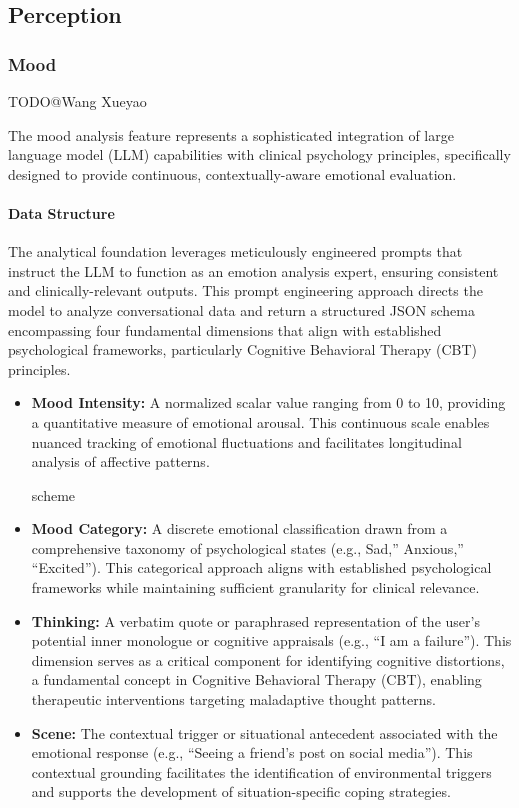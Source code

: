 \subsection{Perception}

\subsubsection{Mood}

TODO@Wang Xueyao  

The mood analysis feature represents a sophisticated integration of large language model (LLM) capabilities with clinical psychology principles, specifically designed to provide continuous, contextually-aware emotional evaluation.

\paragraph{Data Structure}

The analytical foundation leverages meticulously engineered prompts that instruct the LLM to function as an emotion analysis expert, ensuring consistent and clinically-relevant outputs. This prompt engineering approach directs the model to analyze conversational data and return a structured JSON schema encompassing four fundamental dimensions that align with established psychological frameworks, particularly Cognitive Behavioral Therapy (CBT) principles.

\begin{itemize}
\item \textbf{Mood Intensity:} A normalized scalar value ranging from 0 to 10, providing a quantitative measure of emotional arousal. This continuous scale enables nuanced tracking of emotional fluctuations and facilitates longitudinal analysis of affective patterns.

scheme

\item \textbf{Mood Category:} A discrete emotional classification drawn from a comprehensive taxonomy of psychological states (e.g., Sad,'' Anxious,'' ``Excited''). This categorical approach aligns with established psychological frameworks while maintaining sufficient granularity for clinical relevance.

\item \textbf{Thinking:} A verbatim quote or paraphrased representation of the user's potential inner monologue or cognitive appraisals (e.g., ``I am a failure''). This dimension serves as a critical component for identifying cognitive distortions, a fundamental concept in Cognitive Behavioral Therapy (CBT), enabling therapeutic interventions targeting maladaptive thought patterns.

\item \textbf{Scene:} The contextual trigger or situational antecedent associated with the emotional response (e.g., ``Seeing a friend's post on social media''). This contextual grounding facilitates the identification of environmental triggers and supports the development of situation-specific coping strategies.
\end{itemize}

